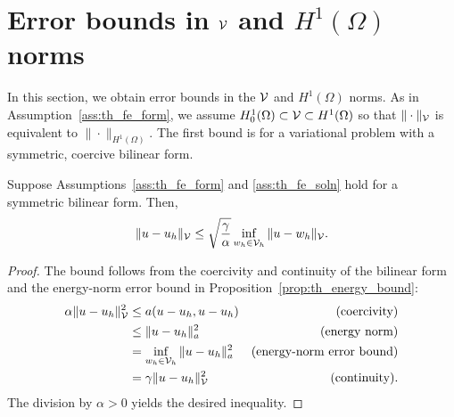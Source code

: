 \section{Error bounds in $\mathcal{V}$ and $H^1(\Omega)$ norms}
In this section, we obtain error bounds in the $\mathcal{V}$ and $H^1(\Omega)$ norms.  As in Assumption~\ref{ass:th_fe_form}, we assume $H^1_0(\Omega) \subset \mathcal{V} \subset H^1(\Omega)$ so that $\| \cdot \|_{\mathcal{V}}$ is equivalent to $\| \cdot \|_{H^1(\Omega)}$.  The first bound is for a variational problem with a symmetric, coercive bilinear form.
\begin{lemma}
  \label{lemma:th_cea_sym}
   Suppose Assumptions~\ref{ass:th_fe_form} and \ref{ass:th_fe_soln} hold for a symmetric bilinear form. Then, 
  \begin{equation}
    \| u - u_h \|_{\mathcal{V}} \leq \sqrt{\frac{\gamma}{\alpha}} \inf_{w_h \in \mathcal{V}_h} \| u - w_h \|_{\mathcal{V}}.
    \label{eq:th_cea_sym}
  \end{equation}
  \begin{proof}
    The bound follows from the coercivity and continuity of the bilinear form and the energy-norm error bound in Proposition~\eqref{prop:th_energy_bound}:
    \begin{align*}
      \alpha \| u - u_h \|^2_{\mathcal{V}}
      &\leq a(u - u_h, u - u_h) & \text{(coercivity)} \\
      &\leq \| u - u_h \|_a^2 & \text{(energy norm)} \\
      & = \inf_{w_h \in \mathcal{V}_h} \| u - u_h \|_a^2 & \text{(energy-norm error bound)} \\
      & = \gamma \| u - u_h \|^2_{\mathcal{V}} & \text{(continuity)}.
    \end{align*}
    The division by $\alpha > 0$ yields the desired inequality.
  \end{proof}
\end{lemma}

